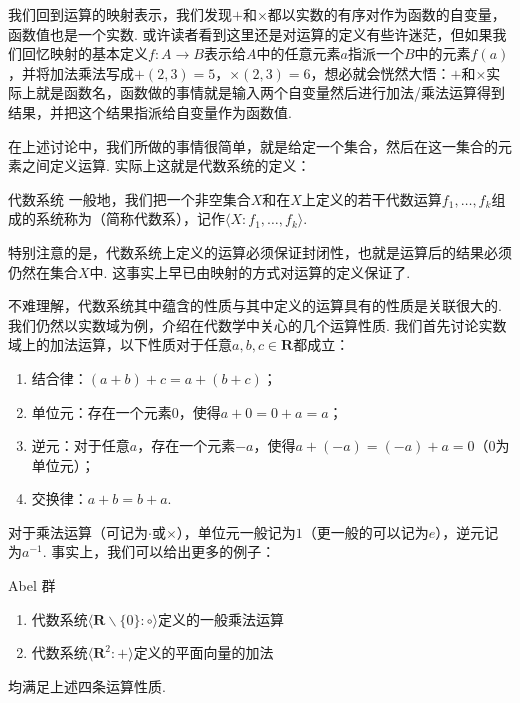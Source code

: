 我们回到运算的映射表示，我们发现$+$和$\times$都以实数的有序对作为函数的自变量，函数值也是一个实数. 或许读者看到这里还是对运算的定义有些许迷茫，但如果我们回忆映射的基本定义$f\colon A\to B$表示给$A$中的任意元素$a$指派一个$B$中的元素$f(a)$，并将加法乘法写成$+(2,3)=5$，$\times(2,3)=6$，想必就会恍然大悟：$+$和$\times$实际上就是函数名，函数做的事情就是输入两个自变量然后进行加法/乘法运算得到结果，并把这个结果指派给自变量作为函数值.

在上述讨论中，我们所做的事情很简单，就是给定一个集合，然后在这一集合的元素之间定义运算. 实际上这就是代数系统的定义：
\begin{definition}{代数系统}{} 
    一般地，我们把一个非空集合$X$和在$X$上定义的若干代数运算$f_1,\ldots,f_k$组成的系统称为（简称代数系），记作$\langle X : f_1,\ldots,f_k\rangle$.
\end{definition}

特别注意的是，代数系统上定义的运算必须保证封闭性，也就是运算后的结果必须仍然在集合$X$中. 这事实上早已由映射的方式对运算的定义保证了.

不难理解，代数系统其中蕴含的性质与其中定义的运算具有的性质是关联很大的. 我们仍然以实数域为例，介绍在代数学中关心的几个运算性质. 我们首先讨论实数域上的加法运算，以下性质对于任意$a,b,c\in\mathbf{R}$都成立：

\begin{enumerate}
    \item 结合律：$(a+b)+c=a+(b+c)$；

    \item 单位元：存在一个元素$0$，使得$a+0=0+a=a$；

    \item 逆元：对于任意$a$，存在一个元素$-a$，使得$a+(-a)=(-a)+a=0$（0为单位元）；

    \item 交换律：$a+b=b+a$.
\end{enumerate}

对于乘法运算（可记为$\cdot$或$\times$），单位元一般记为$1$（更一般的可以记为$e$），逆元记为$a^{-1}$. 事实上，我们可以给出更多的例子：
\begin{example}{}{Abel 群}
    \begin{enumerate}
        \item 代数系统$\langle \mathbf{R}\backslash\{0\}:\circ\rangle$定义的一般乘法运算

        \item 代数系统$\langle \mathbf{R}^2:+\rangle$定义的平面向量的加法
    \end{enumerate}
    均满足上述四条运算性质.
\end{example}

